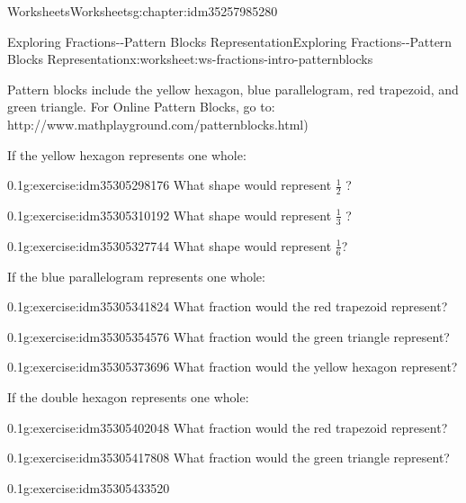 \documentclass[twoside,11pt,]{book}
\begin{document}
\begin{chapterptx}{Worksheets}{}{Worksheets}{}{}{g:chapter:idm35257985280}
\begin{worksheet-section-numberless}{Exploring Fractions-{}-{}Pattern Blocks Representation}{}{Exploring Fractions-{}-{}Pattern Blocks Representation}{}{}{x:worksheet:ws-fractions-intro-patternblocks}
\begin{introduction}{}
Pattern blocks include the yellow hexagon, blue parallelogram, red trapezoid, and green triangle. For Online Pattern Blocks, go to: http:\slash{}\slash{}www.mathplayground.com\slash{}patternblocks.html)%
\end{introduction}%
\begin{introduction}{}%
If the yellow hexagon represents one whole:%
\end{introduction}%
\begin{divisionexercise}{1}{}{0.1}{g:exercise:idm35305298176}%
What shape would represent \(\frac{1}{2} \) ?%
\end{divisionexercise}%
\begin{divisionexercise}{2}{}{0.1}{g:exercise:idm35305310192}%
What shape would represent \(\frac{1}{3} \) ?%
\end{divisionexercise}%
\begin{divisionexercise}{3}{}{0.1}{g:exercise:idm35305327744}%
What shape would represent \(\frac{1}{6} \)?%
\end{divisionexercise}%
\begin{introduction}{}%
If the blue parallelogram represents one whole:%
\end{introduction}%
\begin{divisionexercise}{4}{}{0.1}{g:exercise:idm35305341824}%
What fraction would the red trapezoid represent?%
\end{divisionexercise}%
\begin{divisionexercise}{5}{}{0.1}{g:exercise:idm35305354576}%
What fraction would the green triangle represent?%
\end{divisionexercise}%
\clearpage
\begin{divisionexercise}{6}{}{0.1}{g:exercise:idm35305373696}%
What fraction would the yellow hexagon represent?%
\end{divisionexercise}%
\begin{introduction}{}%
If the double hexagon represents one whole:%
\end{introduction}%
\begin{divisionexercise}{7}{}{0.1}{g:exercise:idm35305402048}%
What fraction would the red trapezoid represent?%
\end{divisionexercise}%
\begin{divisionexercise}{8}{}{0.1}{g:exercise:idm35305417808}%
What fraction would the green triangle represent?%
\end{divisionexercise}%
\begin{divisionexercise}{9}{}{0.1}{g:exercise:idm35305433520}%

\end{divisionexercise}
\end{worksheet-section-numberless}
\end{chapterptx}
\end{document}
